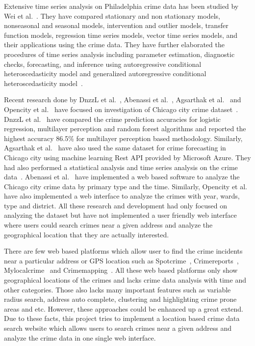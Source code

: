 Extensive time series analysis on Philadelphia crime data has been
studied by Wei et al.~\cite{hid-sp18-409-wei2006time}. They have
compared stationary and non stationary models, nonseasonal and
seasonal models, intervention and outlier models, transfer function
models, regression time series models, vector time series models, and
their applications using the crime data. They have further elaborated
the procedures of time series analysis including parameter estimation,
diagnostic checks, forecasting, and inference using autoregressive
conditional heteroscedasticity model and generalized autoregressive
conditional heteroscedasticity model~\cite{hid-sp18-409-wei2006time}.

Recent research done by DnzzL et al.~\cite{hid-sp18-409-dnzzl},
Abenassi et al.~\cite{hid-sp18-409-abenassi}, Agsarthak et
al.~\cite{hid-sp18-409-agsarthak} and Opencity et
al.~\cite{hid-sp18-409-open-city} have focused on investigation of
Chicago city crime dataset~\cite{hid-sp18-409-www-data.gov}.  DnzzL et
al.~\cite{hid-sp18-409-dnzzl} have compared the crime prediction
accuracies for logistic regression, multilayer perception and random
forest algorithms and reported the highest accuracy 86.5\% for
multilayer perception based methodology. Similarly, Agsarthak et
al.~\cite{hid-sp18-409-agsarthak} have also used the same dataset for
crime forecasting in Chicago city using machine learning Rest API
provided by Microsoft Azure. They had also performed a statistical
analysis and time series analysis on the crime
data~\cite{hid-sp18-409-agsarthak}. Abenassi et
al.~\cite{hid-sp18-409-abenassi} have implemented a web based software
to analyze the Chicago city crime data by primary type and the
time. Similarly, Opencity et al.~\cite{hid-sp18-409-open-city} have
also implemented a web interface to analyze the crimes with year,
wards, type and district. All these research and development had only
focused on analyzing the dataset but have not implemented a user
friendly web interface where users could search crimes near a given
address and analyze the geographical location that they are actually
interested.

There are few web based platforms which allow user to find the crime
incidents near a particular address or GPS location such as
Spotcrime~\cite{hid-sp18-409-www-spotcrime},
Crimereports~\cite{hid-sp18-409-www-crimereports},
Mylocalcrime~\cite{hid-sp18-409-www-mylocalcrime} and
Crimemapping~\cite{hid-sp18-409-www-crimemapping}. All these web based
platforms only show geographical locations of the crimes and lacks
crime data analysis with time and other categories. Those also lacks
many important features such as variable radius search, address auto
complete, clustering and highlighting crime prone areas and
etc. However, these approaches could be enhanced up a great extend.
Due to these facts, this project tries to implement a location based
crime data search website which allows users to search crimes near a
given address and analyze the crime data in one single web interface.

